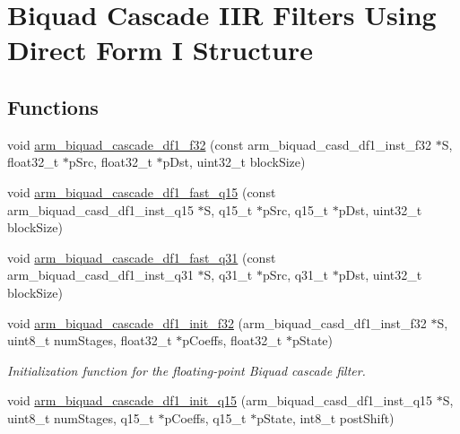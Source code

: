 \hypertarget{group__BiquadCascadeDF1}{}\section{Biquad Cascade I\+IR Filters Using Direct Form I Structure}
\label{group__BiquadCascadeDF1}
\subsection*{Functions}
\begin{DoxyCompactItemize}
\item 
void \hyperlink{group__BiquadCascadeDF1_gaa0dbe330d763e3c1d8030b3ef12d5bdc}{arm\+\_\+biquad\+\_\+cascade\+\_\+df1\+\_\+f32} (const arm\+\_\+biquad\+\_\+casd\+\_\+df1\+\_\+inst\+\_\+f32 $\ast$S, float32\+\_\+t $\ast$p\+Src, float32\+\_\+t $\ast$p\+Dst, uint32\+\_\+t block\+Size)
\item 
void \hyperlink{group__BiquadCascadeDF1_gaffb9792c0220882efd4c58f3c6a05fd7}{arm\+\_\+biquad\+\_\+cascade\+\_\+df1\+\_\+fast\+\_\+q15} (const arm\+\_\+biquad\+\_\+casd\+\_\+df1\+\_\+inst\+\_\+q15 $\ast$S, q15\+\_\+t $\ast$p\+Src, q15\+\_\+t $\ast$p\+Dst, uint32\+\_\+t block\+Size)
\item 
void \hyperlink{group__BiquadCascadeDF1_ga456390f5e448afad3a38bed7d6e380e3}{arm\+\_\+biquad\+\_\+cascade\+\_\+df1\+\_\+fast\+\_\+q31} (const arm\+\_\+biquad\+\_\+casd\+\_\+df1\+\_\+inst\+\_\+q31 $\ast$S, q31\+\_\+t $\ast$p\+Src, q31\+\_\+t $\ast$p\+Dst, uint32\+\_\+t block\+Size)
\item 
void \hyperlink{group__BiquadCascadeDF1_ga8e73b69a788e681a61bccc8959d823c5}{arm\+\_\+biquad\+\_\+cascade\+\_\+df1\+\_\+init\+\_\+f32} (arm\+\_\+biquad\+\_\+casd\+\_\+df1\+\_\+inst\+\_\+f32 $\ast$S, uint8\+\_\+t num\+Stages, float32\+\_\+t $\ast$p\+Coeffs, float32\+\_\+t $\ast$p\+State)
\begin{DoxyCompactList}\small\item\em Initialization function for the floating-\/point Biquad cascade filter. \end{DoxyCompactList}\item 
void \hyperlink{group__BiquadCascadeDF1_gad54c724132f6d742a444eb6df0e9c731}{arm\+\_\+biquad\+\_\+cascade\+\_\+df1\+\_\+init\+\_\+q15} (arm\+\_\+biquad\+\_\+casd\+\_\+df1\+\_\+inst\+\_\+q15 $\ast$S, uint8\+\_\+t num\+Stages, q15\+\_\+t $\ast$p\+Coeffs, q15\+\_\+t $\ast$p\+State, int8\+\_\+t post\+Shift)

\end{DoxyCompactItemize}
